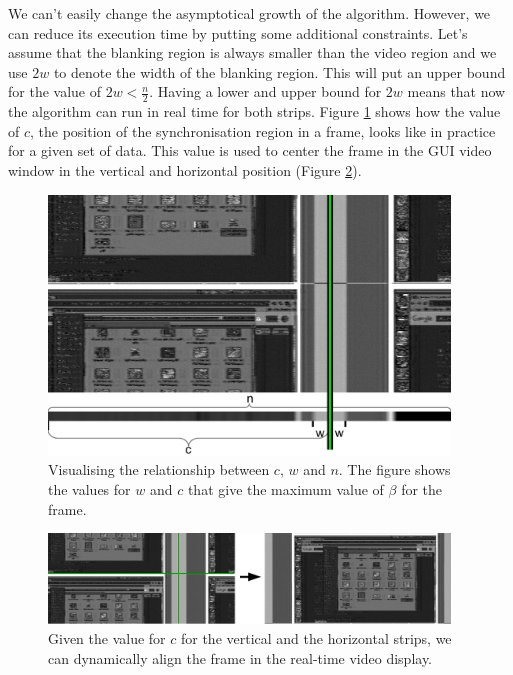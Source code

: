 \documentclass[a4paper,12pt,twoside,openright]{report}
\begin{document}
We can't easily change the asymptotical growth of the algorithm. However, we can reduce its execution time by putting some additional constraints. Let's assume that the blanking region is always smaller than the video region and we use $2w$ to denote the width of the blanking region. This will put an upper bound for the value of $2w < \frac{n}{2}$. Having a lower and upper bound for $2w$ means that now the algorithm can run in real time for both strips. Figure \ref{fig:syncexplained} shows how the value of $c$, the position of the synchronisation region in a frame, looks like in practice for a given set of data. This value is used to center the frame in the GUI video window in the vertical and horizontal position (Figure \ref{fig:syncalligned}).

\begin{figure}[h]
\centering
\includegraphics[width=0.95\textwidth]{detectionexplained}
\caption{Visualising the relationship between $c$, $w$ and $n$. The figure shows the values for $w$ and $c$ that give the maximum value of $\beta$ for the frame.}
\label{fig:syncexplained}
\end{figure}

\begin{figure}[h]
\centering
\includegraphics[width=0.95\textwidth]{frame_sync}
\caption{Given the value for $c$ for the vertical and the horizontal strips, we can dynamically align the frame in the real-time video display.}
\label{fig:syncalligned}
\end{figure}
\end{document}
